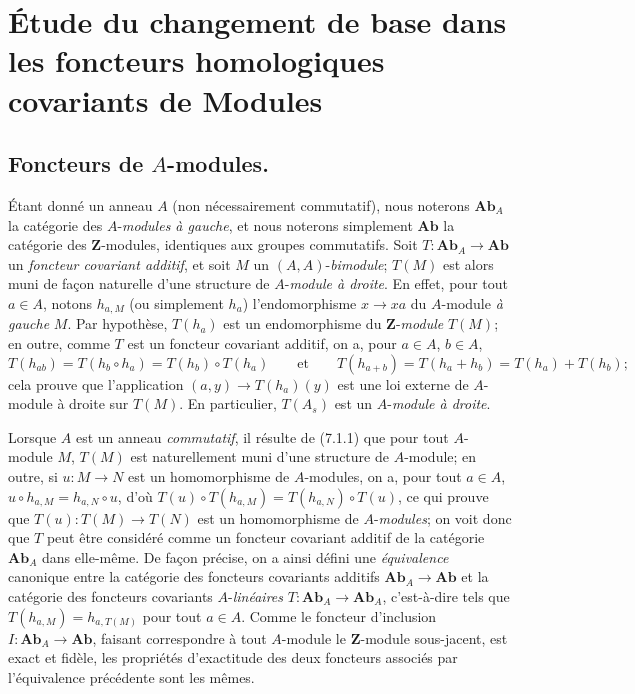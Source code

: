 \section{Étude du changement de base dans les foncteurs homologiques covariants de Modules}
\label{section:III.7.fr}

\subsection{Foncteurs de $A$-modules.}
\label{subsection:III.7.1.fr}

\begin{env}[7.1.1]
Étant donné un anneau $A$ (non nécessairement commutatif), nous noterons
$\boldsymbol{Ab}_A$ la catégorie des $A$-\emph{modules à gauche}, et nous noterons
simplement $\boldsymbol{Ab}$ la catégorie des $\mathbf Z$-modules, identiques aux
groupes commutatifs. Soit $T:\boldsymbol{Ab}_A\longrightarrow\boldsymbol{Ab}$
un \emph{foncteur covariant additif}, et soit $M$ un $(A,A)$-\emph{bimodule}; $T(M)$ est
alors muni de façon naturelle d'une structure de $A$-\emph{module à droite}. En
effet, pour tout $a\in A$, notons $h_{a,M}$ (ou simplement $h_a$)
l'endomorphisme $x\to xa$ du $A$-module \emph{à gauche} $M$. Par hypothèse,
$T(h_a)$ est un endomorphisme du $\mathbf Z$-\emph{module} $T(M)$; en outre, comme
$T$ est un foncteur covariant additif, on a, pour $a\in A$, $b\in A$,
\[
  T(h_{ab})
  =
  T(h_b\circ h_a)
  =
  T(h_b)\circ T(h_a)
  \qquad\text{et}\qquad
  T(h_{a+b})
  =
  T(h_a+h_b)
  =
  T(h_a)+T(h_b);
\]
cela prouve que l'application $(a,y)\to T(h_a)(y)$
est une loi externe de $A$-module à droite sur $T(M)$. En particulier,
$T(A_s)$ est un $A$-\emph{module à droite}.
\end{env}

\begin{env}[7.1.2]
Lorsque $A$ est un anneau \emph{commutatif}, il résulte de (7.1.1) que pour tout
$A$-module $M$, $T(M)$ est naturellement muni d'une structure de $A$-module;
en outre, si $u:M\to N$ est un homomorphisme de $A$-modules, on a, pour tout
$a\in A$, $u\circ h_{a,M}=h_{a,N}\circ u$,
d'où $T(u)\circ T(h_{a,M})=T(h_{a,N})\circ T(u)$,
ce qui prouve que $T(u):T(M)\to T(N)$ est un homomorphisme de $A$-\emph{modules}; on
voit donc que $T$ peut être considéré comme un foncteur covariant additif de
la catégorie $\boldsymbol{Ab}_A$ dans elle-même. De façon précise, on a ainsi
défini une \emph{équivalence} canonique entre la catégorie des foncteurs covariants
additifs $\boldsymbol{Ab}_A\to\boldsymbol{Ab}$ et la catégorie des foncteurs
covariants $A$-\emph{linéaires}
$T:\boldsymbol{Ab}_A\longrightarrow\boldsymbol{Ab}_A$,
c'est-à-dire tels que
$T(h_{a,M})=h_{a,T(M)}$ pour tout $a\in A$.
Comme le foncteur d'inclusion $I:\boldsymbol{Ab}_A\longrightarrow\boldsymbol{Ab}$,
faisant correspondre à tout $A$-module le $\mathbf Z$-module sous-jacent, est
exact et fidèle, les propriétés d'exactitude des deux foncteurs associés par
l'équivalence précédente sont les mêmes.
\end{env}


